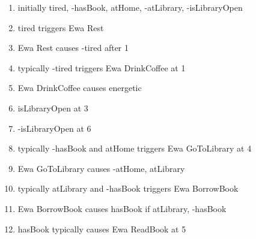 \documentclass{article}
\begin{document}
\begin{enumerate}
    \item initially tired, -hasBook, atHome, -atLibrary, -isLibraryOpen

    \item tired triggers Ewa Rest
    \item Ewa Rest causes -tired after 1
    \item typically -tired triggers Ewa DrinkCoffee at 1
    \item Ewa DrinkCoffee causes energetic
    \item isLibraryOpen at 3
    \item -isLibraryOpen at 6
    \item typically -hasBook and atHome triggers Ewa GoToLibrary at 4
    \item Ewa GoToLibrary causes -atHome, atLibrary
    \item typically atLibrary and -hasBook triggers Ewa BorrowBook
    \item Ewa BorrowBook causes hasBook if atLibrary, -hasBook
    \item hasBook typically causes Ewa ReadBook at 5
\end{enumerate}
\end{document}
